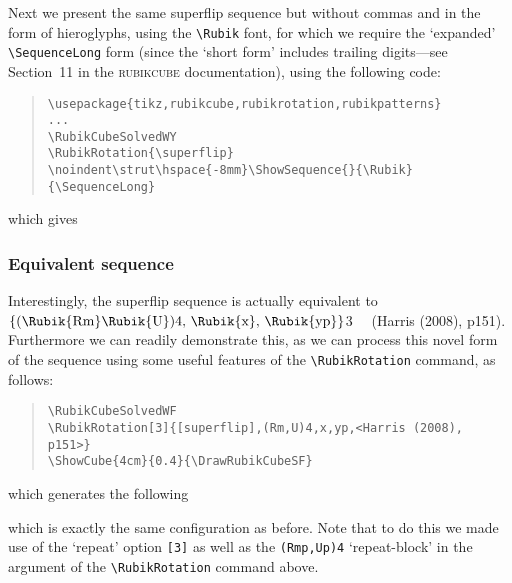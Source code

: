 \documentclass[a4paper]{article}
\newcommand{\Rubikbracket}[1]{$\left(\mbox{#1}\right)$}
\newcommand{\Rubikbrace}[1]{$\left\{\mbox{#1}\right\}$}
\begin{document}
\pagebreak

Next  we present the same superflip sequence but without commas  and in 
the form of hieroglyphs, using  the \verb!\Rubik! font, for which we 
require the `expanded' \verb!\SequenceLong!  form (since the `short form' 
includes trailing digits---see Section~11 in the \textsc{rubikcube} 
documentation), using the  following code:

\begin{quote}
\begin{verbatim}
\usepackage{tikz,rubikcube,rubikrotation,rubikpatterns}
...
\RubikCubeSolvedWY
\RubikRotation{\superflip}
\noindent\strut\hspace{-8mm}\ShowSequence{}{\Rubik}{\SequenceLong}
\end{verbatim}
\end{quote}
which gives


\bigskip

\RubikCubeSolvedWY
\RubikRotation{\superflip}
\noindent\strut\hspace{-8mm}\ShowSequence{}{\Rubik}{\SequenceLong}


\bigskip

\subsubsection*{Equivalent sequence}


Interestingly,  the superflip sequence is actually equivalent to
\Rubikbrace{\Rubikbracket{\Rubik{Rm}\Rubik{U}}4, \Rubik{x}, 
\Rubik{yp}}3 \ \ (Harris (2008), p151).
Furthermore we can readily demonstrate this, as we can process 
this novel form of the sequence using  some useful features of 
the \verb!\RubikRotation! command, as follows:

\begin{quote}
\begin{verbatim}
\RubikCubeSolvedWF
\RubikRotation[3]{[superflip],(Rm,U)4,x,yp,<Harris (2008), p151>}
\ShowCube{4cm}{0.4}{\DrawRubikCubeSF}
\end{verbatim}
\end{quote}
which generates the following 

\begin{figure}[hbt]
  \centering
  \RubikCubeSolvedWY
  \end{figure}
{\noindent}which is exactly the same configuration as before.
Note that to do this we made  use of  the `repeat'  option \verb![3]!  
as well as  the \verb!(Rmp,Up)4! `repeat-block' in 
the argument of  the \verb!\RubikRotation! command above. 
\end{document}

